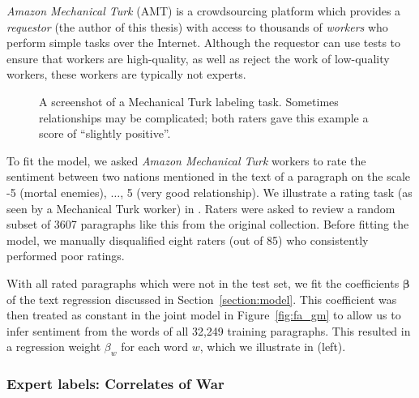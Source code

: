 \emph{Amazon Mechanical Turk} (AMT) is a crowdsourcing platform which
provides a \emph{requestor} (the author of this thesis) with access to
thousands of \emph{workers} who perform simple tasks over the
Internet.  Although the requestor can use tests to ensure that workers
are high-quality, as well as reject the work of low-quality workers,
these workers are typically not experts.

\begin{figure}
  \setlength\fboxsep{0pt}
  \setlength\fboxrule{0.5pt}
  \center {}
  \label{fig:mechanical_turk_sample}
  \small\caption{A screenshot of a Mechanical Turk labeling task.
    Sometimes relationships may be complicated; both raters gave this
    example a score of ``slightly positive''.}
  \normalsize
\end{figure}

To fit the model, we asked \emph{Amazon Mechanical Turk} workers to
rate the sentiment between two nations mentioned in the text of a
paragraph on the scale -5 (mortal enemies), $\ldots$, 5 (very good
relationship). We illustrate a rating task (as seen by a Mechanical
Turk worker) in . Raters were asked to
review a random subset of 3607 paragraphs like this from the original
collection.  Before fitting the model, we manually disqualified eight
raters (out of 85) who consistently performed poor ratings.

With all rated paragraphs which were not in the test set, we fit the
coefficients $\bm \beta$ of the text regression discussed in
Section~\ref{section:model}.  This coefficient was then treated as
constant in the joint model in Figure~\ref{fig:fa_gm} to allow us to
infer sentiment from the words of all 32,249 training paragraphs.
This resulted in a regression weight $\beta_w$ for each word $w$,
which we illustrate in  (left).

\subsubsection{Expert labels: Correlates of War}
\label{section:correlates_of_war}

